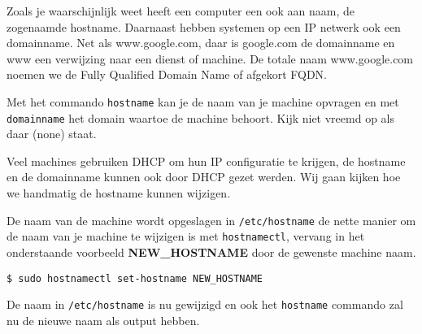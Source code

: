 Zoals je waarschijnlijk weet heeft een computer een ook aan naam, de zogenaamde hostname. Daarnaast hebben systemen op een IP netwerk ook een domainname. Net als www.google.com, daar is google.com de domainname en www een verwijzing naar een dienst of machine. De totale naam www.google.com noemen we de Fully Qualified Domain Name of afgekort FQDN.

Met het commando \texttt{hostname} kan je de naam van je machine opvragen en met \texttt{domainname} het domain waartoe de machine behoort. Kijk niet vreemd op als daar (none) staat.

Veel machines gebruiken DHCP om hun IP configuratie te krijgen, de hostname en de domainname kunnen ook door DHCP gezet werden. Wij gaan kijken hoe we handmatig de hostname kunnen wijzigen.

De naam van de machine wordt opgeslagen in \texttt{/etc/hostname} de nette manier om de naam van je machine te wijzigen is met \texttt{hostnamectl}, vervang in het onderstaande voorbeeld \textbf{NEW\_HOSTNAME} door de gewenste machine naam.
\begin{lstlisting}
$ sudo hostnamectl set-hostname NEW_HOSTNAME
\end{lstlisting}
De naam in \texttt{/etc/hostname} is nu gewijzigd en ook het \texttt{hostname} commando zal nu de nieuwe naam als output hebben.

